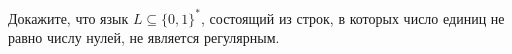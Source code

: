 Докажите, что язык $L \subseteq \{0, 1\}^*$, состоящий из строк, в которых число единиц не равно числу нулей, не является
регулярным.